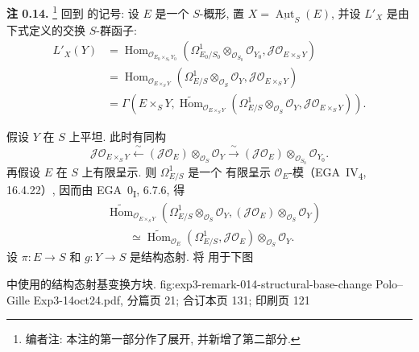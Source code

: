\medskip
\noindent{}\textbf{注 0.14.}
\footnote{编者注: 本注的第一部分作了展开, 并新增了第二部分.}
回到  的记号:
设 \(E\) 是一个 \(S\)-概形, 置 \(X=\underline{\operatorname{Aut}}_S(E)\),
并设 \(L'_X\) 是由下式定义的交换 \(S\)-群函子:
\begin{align*}
 L'_X(Y)
 &=\operatorname{Hom}_{\mathscr O_{E_0\times_{S_0}Y_0}}
   \left(
     \Omega^1_{E_0/S_0}\otimes_{\mathscr O_{S_0}}\mathscr O_{Y_0},
     \mathscr J\mathscr O_{E\times_S Y}
   \right)\\
 &=\operatorname{Hom}_{\mathscr O_{E\times_S Y}}
   \left(
     \Omega^1_{E/S}\otimes_{\mathscr O_S}\mathscr O_Y,
     \mathscr J\mathscr O_{E\times_S Y}
   \right)\\
 &=\Gamma\!\left(
     E\times_S Y,
     \widetilde{\operatorname{Hom}}_{\mathscr O_{E\times_S Y}}
     \left(
       \Omega^1_{E/S}\otimes_{\mathscr O_S}\mathscr O_Y,
       \mathscr J\mathscr O_{E\times_S Y}
     \right)
   \right).
\end{align*}

假设 \(Y\) 在 \(S\) 上平坦. 此时有同构
\[
 \mathscr J\mathscr O_{E\times_S Y}
 \xleftarrow{\ \sim\ }
 (\mathscr J\mathscr O_E)\otimes_{\mathscr O_S}\mathscr O_Y
 \xrightarrow{\ \sim\ }
 (\mathscr J\mathscr O_E)\otimes_{\mathscr O_{S_0}}\mathscr O_{Y_0}.
\]
再假设 \(E\) 在 \(S\) 上有限呈示. 则 \(\Omega^1_{E/S}\) 是一个
有限呈示 \(\mathscr O_E\)-模（EGA~IV\textsubscript{4}, 16.4.22）,
因而由 EGA~0\textsubscript{I}, 6.7.6, 得
\begin{align*}
 &\widetilde{\operatorname{Hom}}_{\mathscr O_{E\times_S Y}}
 \left(
   \Omega^1_{E/S}\otimes_{\mathscr O_S}\mathscr O_Y,
   (\mathscr J\mathscr O_E)\otimes_{\mathscr O_S}\mathscr O_Y
 \right)\\
 &\qquad\simeq
 \widetilde{\operatorname{Hom}}_{\mathscr O_E}
 \left(\Omega^1_{E/S},\mathscr J\mathscr O_E\right)
 \otimes_{\mathscr O_S}\mathscr O_Y.
\end{align*}
设 \(\pi:E\to S\) 和 \(g:Y\to S\) 是结构态射.
将  用于下图

  { 中使用的结构态射基变换方块.}
  {fig:exp3-remark-014-structural-base-change}
  {Polo--Gille Exp3-14oct24.pdf, 分篇页 21; 合订本页 131; 印刷页 121}


